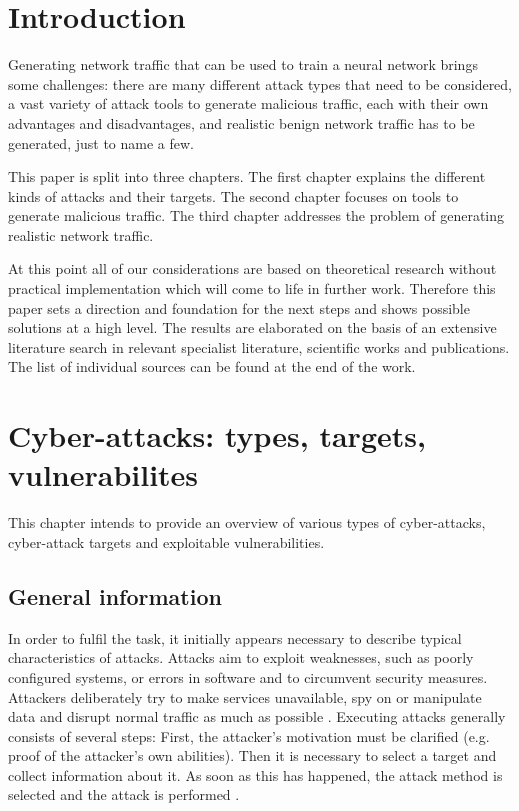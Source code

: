 \documentclass[conference]{IEEEtran}
\begin{document}
\section{Introduction}
Generating network traffic that can be used to train a neural network brings some challenges: there are many different attack types that need to be considered, a vast variety of attack tools to generate malicious traffic, each with their own advantages and disadvantages, and realistic benign network traffic has to be generated, just to name a few.

This paper is split into three chapters. The first chapter explains the different kinds of attacks and their targets. The second chapter focuses on tools to generate malicious traffic. The third chapter addresses the problem of generating realistic network traffic. 

At this point all of our considerations are based on theoretical research without practical implementation which will come to life in further work. Therefore this paper sets a direction and foundation for the next steps and shows possible solutions at a high level. The results are elaborated on the basis of an extensive literature search in relevant specialist literature, scientific works and publications. The list of individual sources can be found at the end of the work.

\section{Cyber-attacks: types, targets, vulnerabilites}
\label{sec:cattv}

This chapter intends to provide an overview of various types of cyber-attacks, cyber-attack targets and exploitable vulnerabilities. 

\subsection{General information}
In order to fulfil the task, it initially appears necessary to describe typical characteristics of attacks. Attacks aim to exploit weaknesses, such as poorly configured systems, or errors in software and to circumvent security measures. Attackers deliberately try to make services unavailable, spy on or manipulate data and disrupt normal traffic as much as possible \cite{b1}. Executing attacks generally consists of several steps: First, the attacker's motivation must be clarified (e.g. proof of the attacker's own abilities). Then it is necessary to select a target and collect information about it. As soon as this has happened, the attack method is selected and the attack is performed \cite{b2}. 
\end{document}
